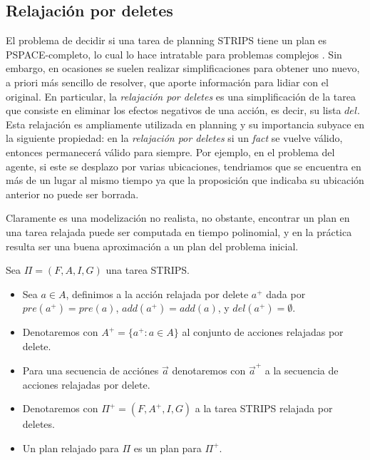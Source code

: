 \subsection{Relajación por deletes}

El problema de decidir si una tarea de planning STRIPS tiene un plan es
PSPACE-completo, lo cual lo hace intratable para problemas complejos
\citep{Nau-Ghallab-Malik-Traverso-2004}. Sin embargo, en ocasiones se suelen
realizar simplificaciones para obtener uno nuevo, a priori más sencillo de
resolver, que aporte información para lidiar con el original. En particular, la
\emph{relajación por deletes} es una simplificación de la tarea que consiste en
eliminar los efectos negativos de una acción, es decir, su lista $del$. Esta
relajación es ampliamente utilizada en planning y su importancia subyace en la
siguiente propiedad: en la \emph{relajación por deletes} si un \emph{fact} se
vuelve válido, entonces permanecerá válido para siempre. Por ejemplo, en el
problema del agente, si este se desplazo por varias ubicaciones, tendriamos que
se encuentra en más de un lugar al mismo tiempo ya que la proposición que
indicaba su ubicación anterior no puede ser borrada.

Claramente es una modelización no realista, no obstante, encontrar un plan en una
tarea relajada puede ser computada en tiempo polinomial, y en la práctica
resulta ser una buena aproximación a un plan del problema inicial.

\begin{mydef}
    Sea $\Pi = (F, A, I, G)$ una tarea STRIPS.
    \begin{itemize}
        \item Sea $a \in A$, definimos a la acción relajada por delete $a^{+}$
        dada por $pre(a^{+}) = pre(a)$, $add(a^{+}) = add(a)$, y $del(a^{+}) =
        \emptyset$.

        \item Denotaremos con $A^{+} = \{a^{+} : a \in A\}$ al conjunto de
        acciones relajadas por delete.

        \item Para una secuencia de acciónes $\vec{a}$ denotaremos con
        $\vec{a}^{+}$ a la secuencia de acciones relajadas por delete.

        \item Denotaremos con $\Pi^{+} = (F, A^{+}, I, G)$ a la tarea STRIPS
        relajada por deletes.

        \item Un plan relajado para $\Pi$ es un plan para $\Pi^{+}$.
    \end{itemize}
\end{mydef}

